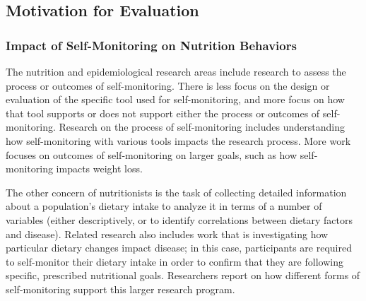 




\subsection{Motivation for Evaluation}

\subsubsection{Impact of Self-Monitoring on Nutrition Behaviors}

The nutrition and epidemiological research areas include research to assess the process or outcomes of self-monitoring. There is less focus on the design or evaluation of the specific tool used for self-monitoring, and more focus on how that tool supports or does not support either the process or outcomes of self-monitoring. Research on the process of self-monitoring includes understanding how self-monitoring with various tools impacts the research process. More work focuses on outcomes of self-monitoring on larger goals, such as how self-monitoring impacts weight loss. 

The other concern of nutritionists is the task of collecting detailed information about a population's dietary intake to analyze it in terms of a number of variables (either descriptively, or to identify correlations between dietary factors and disease). Related research also includes work that is investigating how particular dietary changes impact disease; in this case, participants are required to self-monitor their dietary intake in order to confirm that they are following specific, prescribed nutritional goals. Researchers report on how different forms of self-monitoring support this larger research program. 


